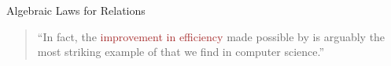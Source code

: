 \begin{frame}{}
\end{frame}

\begin{frame}{}
\end{frame}


\begin{frame}{}
\end{frame}

\begin{frame}{}

  \vspace{0.50cm}
  \centerline{\Large Algebraic Laws for Relations}
\end{frame}

\begin{frame}{}
\end{frame}

\begin{frame}{}
\end{frame}

\begin{frame}{}
  \begin{quote}
    ``In fact, the \textcolor{brown}{improvement in efficiency} made possible
    by 
    is arguably the most striking example of  
    that we find in computer science.''
  \end{quote}
\end{frame}

